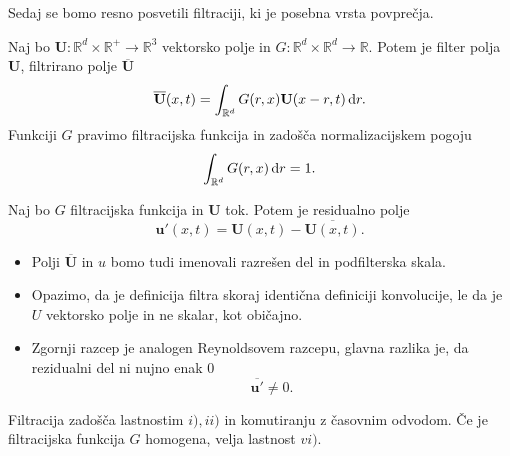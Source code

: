 \documentclass[mat2, tisk]{fmfdelo}
\newcommand{\R}{\mathbb R}
\newcommand{\bd}{\textbf}
\begin{document}
Sedaj se bomo resno posvetili filtraciji, ki je posebna vrsta povprečja.
\begin{definicija}
Naj bo $\bd{U}: \R^d\times \R^+ \rightarrow \R^3$ vektorsko polje in $G: \R^d\times \R^d \rightarrow \R$.
Potem je filter polja $\bd{U}$, filtrirano polje $\overline{\bd{U}}$
\begin{equation}
\overline{\bd{U}}(x, t) = \int_{\R^d} G(r, x)\bd{U}(x-r, t) \dif r.
\end{equation}
Funkciji $G$ pravimo filtracijska funkcija in zadošča normalizacijskem pogoju 
\begin{equation}
\label{renormal}
\int_{\R^d} G(r, x) \dif r = 1.
\end{equation}
\end{definicija}

\begin{definicija}
Naj bo $G$ filtracijska funkcija in $\bd{U}$ tok. Potem je residualno polje 
\begin{equation}
\bd{u}'(x, t) = \bd{U}(x, t) - \overline{\bd{U}(x, t)}.
\end{equation}
\end{definicija}

\begin{opomba}
  \hfill
\begin{itemize}
\item Polji $\overline{\bd{U}}$ in $u$ bomo tudi imenovali razrešen del in podfilterska skala.
\item Opazimo, da je definicija filtra skoraj identična definiciji konvolucije, le da je  
$U$ vektorsko polje in ne skalar, kot običajno.
\item Zgornji razcep je analogen Reynoldsovem razcepu, glavna razlika je, da rezidualni 
del ni nujno enak $0$
$$ \overline{\bd{u}'} \neq 0.$$
\end{itemize}
\end{opomba}

\begin{trditev}
Filtracija zadošča lastnostim $i), ii)$ in komutiranju z časovnim odvodom. 
Če je filtracijska funkcija $G$ homogena, velja lastnost $vi)$.
\end{trditev}
\end{document}
